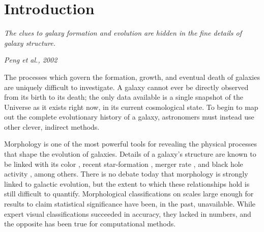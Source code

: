 \chapter{Introduction}
\label{chap:intro}
\epigraph{\textit{The clues to galaxy formation and evolution are hidden in the fine details of galaxy structure.}}{\textit{Peng et al., 2002}}

The processes which govern the formation, growth, and eventual death of galaxies are uniquely difficult to investigate. A galaxy cannot ever be directly observed from its birth to its death; the only data available is a single snapshot of the Universe as it exists right now, in its current cosmological state. To begin to map out the complete evolutionary history of a galaxy, astronomers must instead use other clever, indirect methods.

Morphology is one of the most powerful tools for revealing the physical processes that shape the evolution of galaxies. Details of a galaxy's structure are known to be linked with its color \citep{Tully1982,Strateva2001,Baldry2004}, recent star-formation \citep{Conselice2006,Martin2007,Mignoli2009}, merger rate \citep{Hammer2009,Oesch2010,Smethurst2017}, and black hole activity \citep{Athanassoula1992,Friedli1993,Schawinski2010}, among others. There is no debate today that morphology is strongly linked to galactic evolution, but the extent to which these relationships hold is still difficult to quantify. Morphological classifications on scales large enough for results to claim statistical significance have been, in the past, unavailable. While expert visual classifications succeeded in accuracy, they lacked in numbers, and the opposite has been true for computational methods. 

